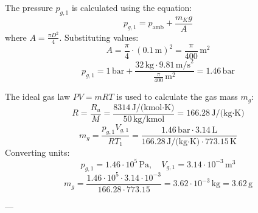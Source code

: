 The pressure \( p_{g,1} \) is calculated using the equation:  
\[
p_{g,1} = p_{\text{amb}} + \frac{m_K g}{A}
\]  
where \( A = \frac{\pi D^2}{4} \). Substituting values:  
\[
A = \frac{\pi}{4} \cdot (0.1 \, \text{m})^2 = \frac{\pi}{400} \, \text{m}^2
\]  
\[
p_{g,1} = 1 \, \text{bar} + \frac{32 \, \text{kg} \cdot 9.81 \, \text{m/s}^2}{\frac{\pi}{400} \, \text{m}^2} = 1.46 \, \text{bar}
\]  

The ideal gas law \( PV = mRT \) is used to calculate the gas mass \( m_g \):  
\[
R = \frac{R_u}{M} = \frac{8314 \, \text{J/(kmol·K)}}{50 \, \text{kg/kmol}} = 166.28 \, \text{J/(kg·K)}
\]  
\[
m_g = \frac{p_{g,1} V_{g,1}}{R T_1} = \frac{1.46 \, \text{bar} \cdot 3.14 \, \text{L}}{166.28 \, \text{J/(kg·K)} \cdot 773.15 \, \text{K}}
\]  
Converting units:  
\[
p_{g,1} = 1.46 \cdot 10^5 \, \text{Pa}, \quad V_{g,1} = 3.14 \cdot 10^{-3} \, \text{m}^3
\]  
\[
m_g = \frac{1.46 \cdot 10^5 \cdot 3.14 \cdot 10^{-3}}{166.28 \cdot 773.15} = 3.62 \cdot 10^{-3} \, \text{kg} = 3.62 \, \text{g}
\]  

---